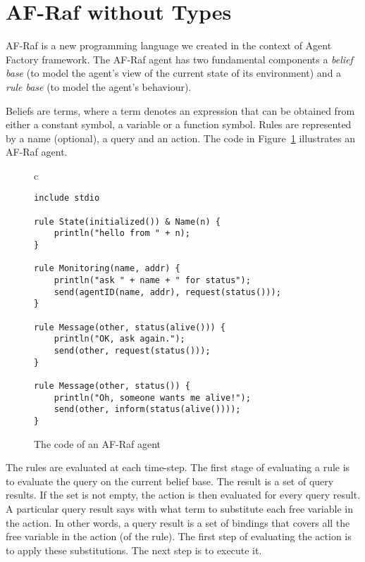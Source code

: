 \documentclass[preprint]{sigplanconf} %
\theoremstyle{remark}
\begin{document}
\section{AF-Raf without Types} \label{sec:af-raf} %

AF-Raf is a new programming language we created in the context of Agent
Factory framework. The AF-Raf agent has two fundamental components a
\textit{belief base} (to model the agent's view of the current state of its
environment) and a \textit{rule base} (to model the agent's behaviour).

Beliefs are terms, where a term denotes an expression that can be obtained
from either a constant symbol, a variable or a function symbol. Rules are
represented by a name (optional), a query and an action.  The code in
Figure~\ref{fig:AF-Raf} illustrates an AF-Raf agent.


\begin{figure}\footnotesize %
\begin{center}
\begin{tabular}{c}
\begin{lstlisting}[style=hs]
include stdio

rule State(initialized()) & Name(n) {
    println("hello from " + n);
}

rule Monitoring(name, addr) {
    println("ask " + name + " for status");
    send(agentID(name, addr), request(status()));
}

rule Message(other, status(alive())) {
    println("OK, ask again.");
    send(other, request(status()));
}

rule Message(other, status()) {
    println("Oh, someone wants me alive!");
    send(other, inform(status(alive())));
}
\end{lstlisting}
\end{tabular}
\end{center}
\caption{The code of an AF-Raf agent}
\label{fig:AF-Raf}
\end{figure} %

The rules are evaluated at each time-step. The first stage of evaluating a
rule is to evaluate the query on the current belief base. The result is a
set of query results. If the set is not empty, the action is then evaluated
for every query result. A particular query result says with what term to
substitute each free variable in the action. In other words, a query result
is a set of bindings that covers all the free variable in the action (of
the rule). The first step of evaluating the action is to apply these
substitutions. The next step is to execute it.
\end{document}
